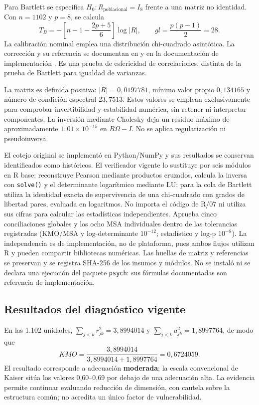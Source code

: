 Para Bartlett se especifica $H_0:R_{\mathrm{poblacional}}=I_8$ frente a una matriz no identidad. Con $n=1102$ y $p=8$, se calcula
\[
T_B=-\left[n-1-\frac{2p+5}{6}\right]\log|R|,
\qquad gl=\frac{p(p-1)}{2}=28.
\]
La calibración nominal emplea una distribución chi-cuadrado asintótica. La corrección y su referencia se documentan en \citet{bartlett1951standardization} y en la documentación de implementación \citep{efatoolsBartlett2026}. Es una prueba de esfericidad de correlaciones, distinta de la prueba de Bartlett para igualdad de varianzas.

La matriz es definida positiva: $|R|=0,0197781$, mínimo valor propio $0,134165$ y número de condición espectral $23,7513$. Estos valores se emplean exclusivamente para comprobar invertibilidad y estabilidad numérica, sin retener ni interpretar componentes. La inversión mediante Cholesky deja un residuo máximo de aproximadamente $1,01\times10^{-15}$ en $R\Omega-I$. No se aplica regularización ni pseudoinversa.

El cotejo original se implementó en Python/NumPy y sus resultados se conservan identificados como históricos. El verificador vigente lo sustituye por seis módulos en R base: reconstruye Pearson mediante productos cruzados, calcula la inversa con \texttt{solve()} y el determinante logarítmico mediante LU; para la cola de Bartlett utiliza la identidad exacta de supervivencia de una chi-cuadrado con grados de libertad pares, evaluada en logaritmos. No importa el código de R/07 ni utiliza sus cifras para calcular las estadísticas independientes. Aprueba cinco conciliaciones globales y los ocho MSA individuales dentro de las tolerancias registradas (KMO/MSA y log-determinante $10^{-12}$; estadístico y log-p $10^{-8}$). La independencia es de implementación, no de plataforma, pues ambos flujos utilizan R y pueden compartir bibliotecas numéricas. Las huellas de matriz y referencias se preservan y se registra SHA-256 de los insumos y módulos. No se instaló ni se declara una ejecución del paquete \texttt{psych}: sus fórmulas documentadas son referencia de implementación.

\subsection{Resultados del diagnóstico vigente}

En las 1.102 unidades, $\sum_{j<k}r_{jk}^2=3,8994014$ y $\sum_{j<k}a_{jk}^2=1,8997764$, de modo que
\[
KMO=\frac{3,8994014}{3,8994014+1,8997764}=0,6724059.
\]
El resultado corresponde a adecuación \textbf{moderada}; la escala convencional de Kaiser sitúa los valores 0,60--0,69 por debajo de una adecuación alta. La evidencia permite continuar evaluando reducción de dimensión, con cautela sobre la estructura común; no acredita un único factor de vulnerabilidad.

